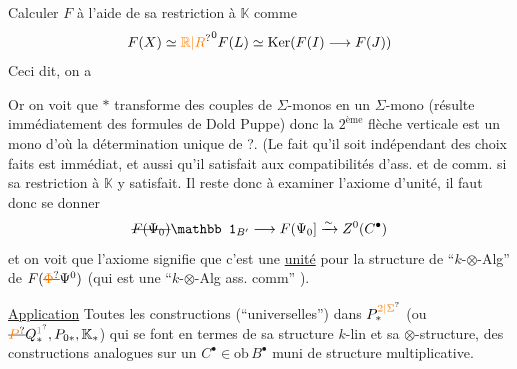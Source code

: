Calculer $F$ à l'aide de sa restriction à $\mathbb{K}$ comme
\[
F(X)\simeq\unsure{\mathbb R|R}^0F(L)\simeq\operatorname{Ker}(F(I)\longrightarrow F(J))
\]
Ceci dit,  on a

Or on voit que  $*$ transforme des couples de $\Sigma$-monos en un $\Sigma$-mono (résulte immédiatement des formules de Dold Puppe) donc la $2^{\text{ème}}$ flèche verticale est un mono d'où la détermination unique de ?. (Le fait qu'il soit indépendant des choix faits est immédiat, et aussi qu'il satisfait aux compatibilités d'ass. et de comm. si sa restriction à $\mathbb{K}$ y satisfait. Il reste donc à examiner l'axiome d'unité,  il faut donc se donner
\[
\deleted{F(\Psi_0)}\mathbb 1_{B'}\longrightarrow F(\Psi_0]\xrightarrow{\sim}Z^0(C^{\bullet})
\]
et on voit que l'axiome signifie que c'est une \uline{unité} pour la structure de ``$k$-$\otimes$-Alg'' de $F(\deleted{\unsure{\Phi}}\Psi^0)$ (qui est une ``$k$-$\otimes$-Alg ass. comm'' ).

\uline{Application} Toutes les constructions (``universelles'') dans $P_*^{\unsure{2|\Sigma}}$  (ou $\deleted{\unsure{P}}Q_*^{\unsure{1}},P_{0*},\mathbb{K}_*$) qui se font  en termes de sa structure $k$-lin et sa $\otimes$-structure,   des constructions analogues sur un $C^{\bullet}\in\mathrm{ob}\,B^{\bullet}$ muni de structure multiplicative.

